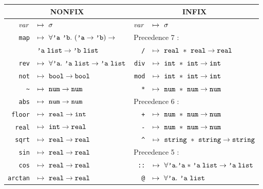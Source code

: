 \begin{figure}
\begin{tabular}{|rl|rl|}
\multicolumn{2}{c}{NONFIX}&     \multicolumn{2}{c}{INFIX}\\
\hline
${\it var}$     & $\mapsto\ \tych$    
                          & ${\it var}$ & $\mapsto\ \tych$\\
\hline
{\tt map}  & $\mapsto\ \forall\atyvar\ \btyvar.\ (\atyvar\to\btyvar)\to$
                          &     \multicolumn{2}{l|}{Precedence 7 :} \\
           & \qquad$\atyvar\ \LIST\to\btyvar\ \LIST$
                          & \verb+/+    & $\mapsto\ \REAL\ \ast\ \REAL
                                                    \to\REAL$\\
{\tt rev}  & $\mapsto\ \forall\atyvar.\ \atyvar\ \LIST\to\atyvar\ \LIST$
                          & {\tt div}   & $\mapsto\ \INT\ \ast\ \INT\to\INT$\\
{\tt not}  & $\mapsto\ \BOOL\to\BOOL$
                          & {\tt mod}   & $\mapsto\ \INT\ \ast\ \INT\to\INT$\\
\verb+~+   & $\mapsto\ \NUM\to\NUM$
                          & \verb+*+    & $\mapsto\ \NUM\ \ast\ \NUM\to\NUM$\\
{\tt abs}  & $\mapsto\ \NUM\to\NUM$
                          &    \multicolumn{2}{l|}{Precedence 6 :} \\
{\tt floor}& $\mapsto\ \REAL\to\INT$
                          & \verb-+-    & $\mapsto\ \NUM\ \ast\ \NUM\to\NUM$\\
{\tt real} & $\mapsto\ \INT\to\REAL$
                          & \verb+-+    & $\mapsto\ \NUM\ \ast\ \NUM\to\NUM$\\
{\tt sqrt} & $\mapsto\ \REAL\to\REAL$
                          & \verb+^+    & $\mapsto\ \STRING\ \ast\ \STRING
                                                    \to\STRING$\\
{\tt sin}  & $\mapsto\ \REAL\to\REAL$
                          &     \multicolumn{2}{l|}{Precedence 5 :} \\
{\tt cos}  & $\mapsto\ \REAL\to\REAL$
                          & \verb+::+   & $\mapsto\ \forall\atyvar.
                                          \atyvar\;{\ast}\;\atyvar\;\LIST
                                          \to\atyvar\;\LIST$\\
{\tt arctan}
           & $\mapsto\ \REAL\to\REAL$
                          & \verb+@+    & $\mapsto\ \forall\atyvar.\
                                          \atyvar\ \LIST\ $\\

\end{tabular}
\end{figure}

